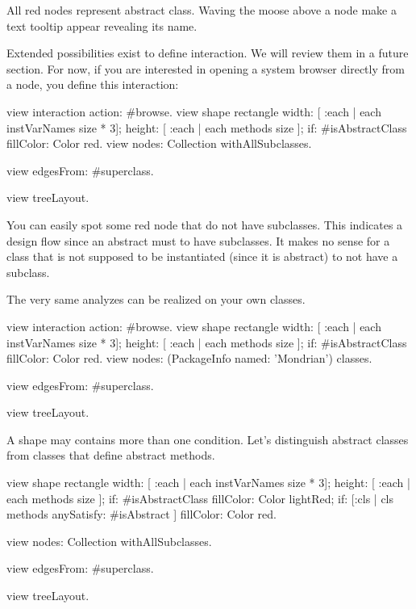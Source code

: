 \documentclass[a4paper,10pt,twoside]{book}
\begin{document}
All red nodes represent abstract class. Waving the moose above a node make a text tooltip appear revealing its name. 

Extended possibilities exist to define interaction. We will review them in a future section. For now, if you are interested in opening a system browser directly from a node, you define this interaction: 

\begin{code}{}
view interaction action: #browse.
view shape rectangle
  width: [ :each | each instVarNames size * 3];
  height: [ :each | each methods size ];
  if: #isAbstractClass fillColor: Color red.
view nodes: Collection withAllSubclasses.

view edgesFrom: #superclass.

view treeLayout.
\end{code}

You can easily  spot some red node that do not have subclasses. This indicates a design flow since an abstract must to have subclasses. It makes no sense for a class that is not supposed to be instantiated (since it is abstract) to not have a subclass.

The very same analyzes can be realized on your own classes.


\begin{code}{}
view interaction action: #browse.
view shape rectangle
  width: [ :each | each instVarNames size * 3];
  height: [ :each | each methods size ];
  if: #isAbstractClass fillColor: Color red.
view nodes: (PackageInfo named: 'Mondrian') classes.

view edgesFrom: #superclass.

view treeLayout.
\end{code}

A shape may contains more than one condition. Let's distinguish abstract classes from classes that define abstract methods.

\begin{code}{}
view shape rectangle
  width: [ :each | each instVarNames size * 3];
  height: [ :each | each methods size ];
  if: #isAbstractClass fillColor: Color lightRed;
  if: [:cls | cls methods anySatisfy: #isAbstract ] fillColor: Color red.

view nodes: Collection withAllSubclasses.

view edgesFrom: #superclass.

view treeLayout.
\end{code}
\end{document}
